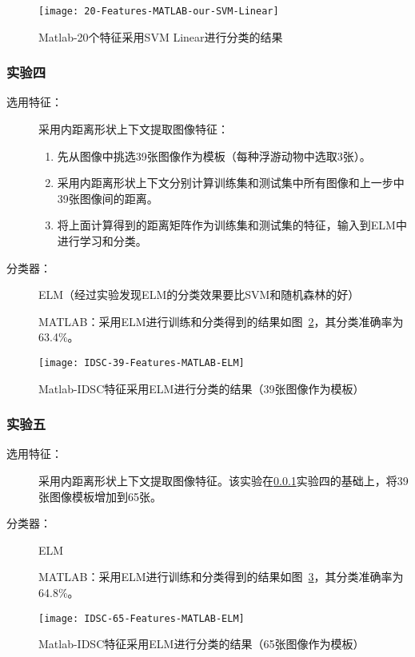 \begin{figure}[!ht]
\centering
\texttt{[image: 20-Features-MATLAB-our-SVM-Linear]}
\caption{Matlab-20个特征采用SVM Linear进行分类的结果}
\label{fig:20-Features-MATLAB-our-SVM-Linear}
\end{figure}

\subsubsection{实验四}
\label{shiyan4}
\begin{description}
\item[选用特征：] 采用内距离形状上下文提取图像特征：
    \begin{enumerate}
    \item 先从图像中挑选39张图像作为模板（每种浮游动物中选取3张）。
    \item 采用内距离形状上下文分别计算训练集和测试集中所有图像和上一步中39张图像间的距离。
    \item 将上面计算得到的距离矩阵作为训练集和测试集的特征，输入到ELM中进行学习和分类。
    \end{enumerate}
\item[分类器：] ELM（经过实验发现ELM的分类效果要比SVM和随机森林的好）

MATLAB：采用ELM进行训练和分类得到的结果如图~\ref{fig:IDSC-39-Features-MATLAB-ELM}，其分类准确率为63.4\%。
\end{description}
\begin{figure}[!ht]
\centering
\texttt{[image: IDSC-39-Features-MATLAB-ELM]}
\caption{Matlab-IDSC特征采用ELM进行分类的结果（39张图像作为模板）}
\label{fig:IDSC-39-Features-MATLAB-ELM}
\end{figure}

\subsubsection{实验五}
\begin{description}
\item[选用特征：] 采用内距离形状上下文提取图像特征。该实验在\ref{shiyan4}实验四的基础上，将39张图像模板增加到65张。
\item[分类器：] ELM

MATLAB：采用ELM进行训练和分类得到的结果如图~\ref{fig:IDSC-65-Features-MATLAB-ELM}，其分类准确率为64.8\%。
\end{description}
\begin{figure}[!ht]
\centering
\texttt{[image: IDSC-65-Features-MATLAB-ELM]}
\caption{Matlab-IDSC特征采用ELM进行分类的结果（65张图像作为模板）}
\label{fig:IDSC-65-Features-MATLAB-ELM}
\end{figure}

